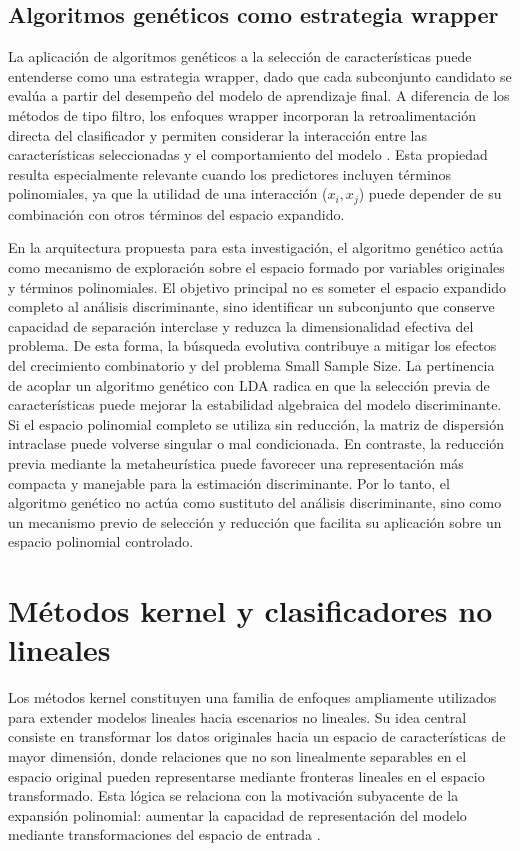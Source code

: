 \subsection{Algoritmos genéticos como estrategia wrapper}

La aplicación de algoritmos genéticos a la selección de características puede entenderse como una estrategia wrapper, dado que cada subconjunto candidato se evalúa a partir del desempeño del modelo de aprendizaje final. A diferencia de los métodos de tipo filtro, los enfoques wrapper incorporan la retroalimentación directa del clasificador y permiten considerar la interacción entre las características seleccionadas y el comportamiento del modelo \cite{kohavi1997wrappers} \cite{guyon2003introduction}. Esta propiedad resulta especialmente relevante cuando los predictores incluyen términos polinomiales, ya que la utilidad de una interacción ($x_i,x_j$) puede depender de su combinación con otros términos del espacio expandido.

En la arquitectura propuesta para esta investigación, el algoritmo genético actúa como mecanismo de exploración sobre el espacio formado por variables originales y términos polinomiales. El objetivo principal no es someter el espacio expandido completo al análisis discriminante, sino identificar un subconjunto que conserve capacidad de separación interclase y reduzca la dimensionalidad efectiva del problema. De esta forma, la búsqueda evolutiva contribuye a mitigar los efectos del crecimiento combinatorio y del problema Small Sample Size.
La pertinencia de acoplar un algoritmo genético con LDA radica en que la selección previa de características puede mejorar la estabilidad algebraica del modelo discriminante. Si el espacio polinomial completo se utiliza sin reducción, la matriz de dispersión intraclase puede volverse singular o mal condicionada. En contraste, la reducción previa mediante la metaheurística puede favorecer una representación más compacta y manejable para la estimación discriminante. Por lo tanto, el algoritmo genético no actúa como sustituto del análisis discriminante, sino como un mecanismo previo de selección y reducción que facilita su aplicación sobre un espacio polinomial controlado.

\section{Métodos kernel y clasificadores no lineales}

Los métodos kernel constituyen una familia de enfoques ampliamente utilizados para
extender modelos lineales hacia escenarios no lineales. Su idea central consiste en
transformar los datos originales hacia un espacio de características de mayor dimensión, donde relaciones que no son linealmente separables en el espacio original pueden representarse mediante fronteras lineales en el espacio transformado. Esta lógica se relaciona con la motivación subyacente de la expansión polinomial: aumentar la capacidad de representación del modelo mediante transformaciones del espacio de entrada \cite{scholkopf2001learning}.

